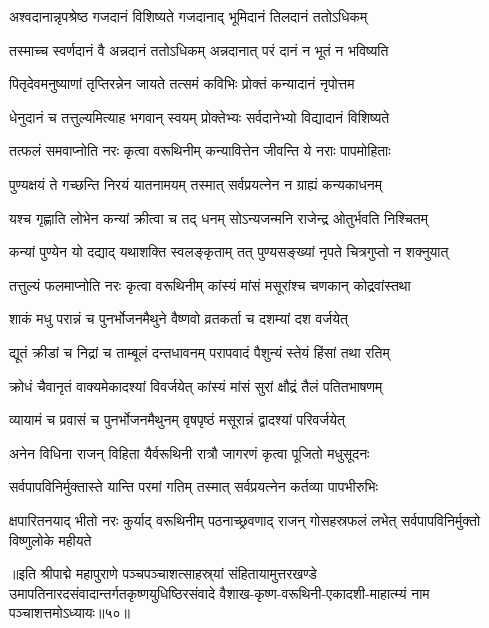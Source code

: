 \twolineshloka
{अश्वदानान्नृपश्रेष्ठ गजदानं विशिष्यते}
{गजदानाद् भूमिदानं तिलदानं ततोऽधिकम्}%

\twolineshloka
{तस्माच्च स्वर्णदानं वै अन्नदानं ततोऽधिकम्}
{अन्नदानात् परं दानं न भूतं न भविष्यति}%

\twolineshloka
{पितृदेवमनुष्याणां तृप्तिरन्नेन जायते}
{तत्समं कविभिः प्रोक्तं कन्यादानं नृपोत्तम}%

\twolineshloka
{धेनुदानं च तत्तुल्यमित्याह भगवान् स्वयम्}
{प्रोक्तेभ्यः सर्वदानेभ्यो विद्यादानं विशिष्यते}%

\twolineshloka
{तत्फलं समवाप्नोति नरः कृत्वा वरूथिनीम्}
{कन्यावित्तेन जीवन्ति ये नराः पापमोहिताः}%

\twolineshloka
{पुण्यक्षयं ते गच्छन्ति निरयं यातनामयम्}
{तस्मात् सर्वप्रयत्नेन न ग्राह्यं कन्यकाधनम्}%

\twolineshloka
{यश्च गृह्णाति लोभेन कन्यां क्रीत्वा च तद् धनम्}
{सोऽन्यजन्मनि राजेन्द्र ओतुर्भवति निश्चितम्}%

\twolineshloka
{कन्यां पुण्येन यो दद्याद् यथाशक्ति स्वलङ्कृताम्}
{तत् पुण्यसङ्ख्यां नृपते चित्रगुप्तो न शक्नुयात्}%

\twolineshloka
{तत्तुल्यं फलमाप्नोति नरः कृत्वा वरूथिनीम्}
{कांस्यं मांसं मसूरांश्च चणकान् कोद्रवांस्तथा}%

\twolineshloka
{शाकं मधु परान्नं च पुनर्भोजनमैथुने}
{वैष्णवो व्रतकर्ता च दशम्यां दश वर्जयेत्}%

\twolineshloka
{द्यूतं क्रीडां च निद्रां च ताम्बूलं दन्तधावनम्}
{परापवादं पैशुन्यं स्तेयं हिंसां तथा रतिम्}%

\twolineshloka
{क्रोधं चैवानृतं वाक्यमेकादश्यां विवर्जयेत्}
{कांस्यं मांसं सुरां क्षौद्रं  तैलं पतितभाषणम्}%

\twolineshloka
{व्यायामं च प्रवासं च पुनर्भोजनमैथुनम्}
{वृषपृष्ठं मसूरान्नं द्वादश्यां परिवर्जयेत्}%

\twolineshloka
{अनेन विधिना राजन् विहिता यैर्वरूथिनी}
{रात्रौ जागरणं कृत्वा पूजितो मधुसूदनः}%

\twolineshloka
{सर्वपापविनिर्मुक्तास्ते यान्ति परमां गतिम्}
{तस्मात् सर्वप्रयत्नेन कर्तव्या पापभीरुभिः}%

\threelineshloka
{क्षपारितनयाद् भीतो नरः कुर्याद् वरूथिनीम्}
{पठनाच्छ्रवणाद् राजन् गोसहस्रफलं लभेत्}
{सर्वपापविनिर्मुक्तो विष्णुलोके महीयते}%

॥इति श्रीपाद्मे महापुराणे पञ्चपञ्चाशत्साहस्र्यां संहितायामुत्तरखण्डे उमापतिनारदसंवादान्तर्गतकृष्णयुधिष्ठिरसंवादे वैशाख-कृष्ण-वरूथिनी-एकादशी-माहात्म्यं नाम पञ्चाशत्तमोऽध्यायः॥५०॥

